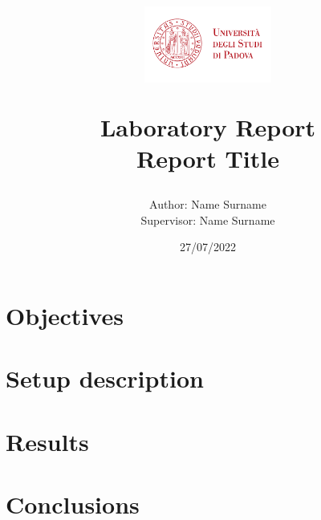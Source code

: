 \documentclass[twocolumn]{article}
\title{
    \vspace{-1cm}
    \includegraphics[height=2.5cm]{imgs/logo-unipd.pdf}
    \par
    \vspace{0.5cm}
    \textbf{Laboratory Report}\\
    Report Title
}
\author{
    Author: {Name Surname} \\
    Supervisor: {Name Surname}
}
\date{27/07/2022}
\begin{document}
\maketitle


\section{Objectives}
\lipsum[1]

\section{Setup description}
\lipsum[2-4]
\section{Results}
\lipsum[5-8]

\section{Conclusions}
\lipsum[1]

\clearpage



\end{document}
